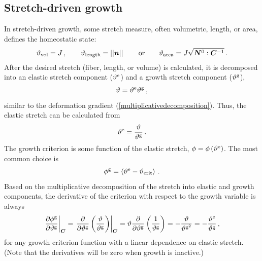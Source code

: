 \documentclass[10pt,letterpaper,oneside]{report}
\newcommand{\ten}[1]{\mbox{\boldmath $#1$}{}}
\newcommand{\scas}[1]{\mbox{{\scriptsize{${\rm{#1}}$}}}{}}
\newcommand{\tens}[1]{\mbox{\boldmath{\scriptsize{$#1$}}}{}}
\begin{document}
\subsection{Stretch-driven growth}
In stretch-driven growth, some stretch measure, often volumetric, length, or area, defines the homeostatic state:
\begin{align}
\vartheta_{\scas{vol}} = J \, , 
\qquad 
\vartheta_{\scas{length}} = || \ten{n} || \,    
\qquad \text{or} \qquad
\vartheta_{\scas{area}} = J \sqrt{ \ten{N}^0 : \ten{C}^{-1} } \, .
\label{stretches}
\end{align}
After the desired stretch (fiber, length, or volume) is calculated, it is decomposed into an elastic stretch component ($\vartheta^{\scas{e}}$) and a growth stretch component ($\vartheta^{\scas{g}}$), 
\begin{equation}
\vartheta = \vartheta^{\scas{e}} \vartheta^{\scas{g}} \, , 
\end{equation}
similar to the deformation gradient (\autoref{multiplicativedecomposition}). 
Thus, the elastic stretch can be calculated from
\begin{equation}
\vartheta^{\scas{e}} = \frac{\vartheta}{\vartheta^{\scas{g}}} \, . 
\end{equation}
The growth criterion is some function of the elastic stretch, $\phi =  \phi \left( \vartheta^{\scas{e}} \right)$. The most common choice is
\begin{equation}
\phi^{\scas{g}} = \left\langle \vartheta^{\scas{e}} - \vartheta_{\scas{crit}} \right\rangle \, . 
\label{growth_criterion}
\end{equation}
Based on the multiplicative decomposition of the stretch into elastic and growth components, the derivative of the criterion with respect to the growth variable is always 
\begin{equation}
\left. \frac{\partial \phi^{\scas{g}}}{\partial \vartheta^{\scas{g}}} \right|_{\tens{C}} = \left. \frac{\partial }{\partial \vartheta^{\scas{g}}} \left( \frac{\vartheta}{ \vartheta^{\scas{g}}} \right) \right|_{\tens{C}} = \vartheta \frac{\partial }{\partial \vartheta^{\scas{g}}} \left( \frac{1}{ \vartheta^{\scas{g}}} \right) = - \frac{\vartheta }{ \vartheta^{\scas{g}^2}} = - \frac{\vartheta^{\scas{e}} }{ \vartheta^{\scas{g}}} \, , 
\label{growth_criterion_deriv}
\end{equation}
for any growth criterion function with a linear dependence on elastic stretch.  
(Note that the derivatives will be zero when growth is inactive.)
\end{document}
